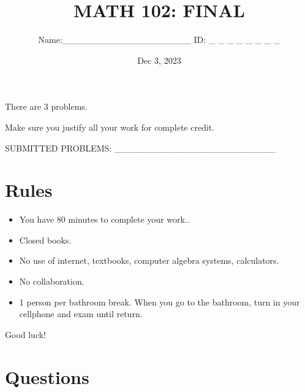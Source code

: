 \documentclass[12pt]{amsart}
\title{ MATH 102: FINAL }
\author{Name:\_\_\_\_\_\_\_\_\_\_\_\_\_\_\_\_\_\_\_\_ ID: \_  \_  \_   \_  \_  \_  \_  \_ 
}
\date{Dec 3, 2023}
\begin{document}
\maketitle


There are 3 problems.

Make sure you justify all your work for complete credit.

\vspace{1cm}

SUBMITTED PROBLEMS: \_\_\_\_\_\_\_\_\_\_\_\_\_\_\_\_\_\_\_\_\_\_\_\_\_

\vspace{3cm}
\section*{Rules}

\begin{itemize}[leftmargin=*]
	\item You have 80  minutes to complete your work..
	\item Closed books.
	\item No use of internet, textbooks, computer algebra systems, calculators.
	\item No collaboration.
	\item 1 person per bathroom break. When you go to the bathroom, turn in your cellphone and exam until return.
\end{itemize}

\begin{center}
	Good luck!
\end{center}

\newpage

\section*{Questions}
\end{document}
